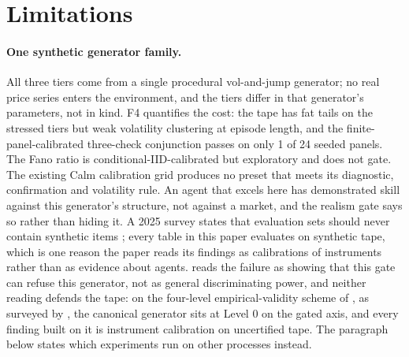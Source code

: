 \section{Limitations}\label{sec:limitations}

\paragraph{One synthetic generator family.} All three tiers come from a single procedural vol-and-jump generator; no real price series enters the environment, and the tiers differ in that generator's parameters, not in kind. F4 quantifies the cost: the tape has fat tails on the stressed tiers but weak volatility clustering at episode length, and the finite-panel-calibrated three-check conjunction passes on only 1 of 24 seeded panels. The Fano ratio is conditional-IID-calibrated but exploratory and does not gate. The existing Calm calibration grid produces no preset that meets its diagnostic, confirmation and volatility rule. An agent that excels here has demonstrated skill against this generator's structure, not against a market, and the realism gate says so rather than hiding it. A 2025 survey states that evaluation sets should never contain synthetic items \citep[p.~15]{fu2025newquant}; every table in this paper evaluates on synthetic tape, which is one reason the paper reads its findings as calibrations of instruments rather than as evidence about agents.  reads the failure as showing that this gate can refuse this generator, not as general discriminating power, and neither reading defends the tape: on the four-level empirical-validity scheme of \citet{axtell1994agent}, as surveyed by \citet{fagiolo2019validation}, the canonical generator sits at Level 0 on the gated axis, and every finding built on it is instrument calibration on uncertified tape. The paragraph below states which experiments run on other processes instead.

